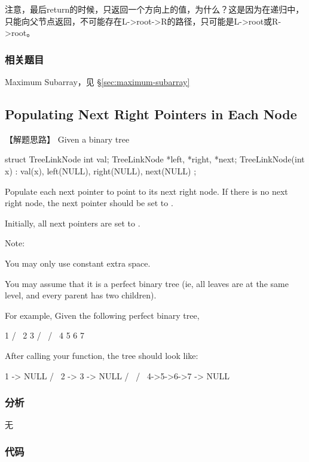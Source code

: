 注意，最后return的时候，只返回一个方向上的值，为什么？这是因为在递归中，只能向父节点返回，不可能存在L->root->R的路径，只可能是L->root或R->root。


\subsubsection{相关题目}
\begindot
\item Maximum Subarray，见 \S \ref{sec:maximum-subarray}
\myenddot


\subsection{Populating Next Right Pointers in Each Node} %
\label{sec:populating-next-right-pointers-in-each-node}


【解题思路】
Given a binary tree
\begin{Code}
	struct TreeLinkNode {
		int val;
		TreeLinkNode *left, *right, *next;
		TreeLinkNode(int x) : val(x), left(NULL), right(NULL), next(NULL) {}
	};
\end{Code}

Populate each next pointer to point to its next right node. If there is no next right node, the next pointer should be set to .

Initially, all next pointers are set to .

Note:
\begindot
\item You may only use constant extra space.
\item You may assume that it is a perfect binary tree (ie, all leaves are at the same level, and every parent has two children).
\myenddot

For example,
Given the following perfect binary tree,
\begin{Code}
	1
	/  \
	2    3
	/ \  / \
	4  5  6  7
\end{Code}

After calling your function, the tree should look like:
\begin{Code}
	1 -> NULL
	/  \
	2 -> 3 -> NULL
	/ \  / \
	4->5->6->7 -> NULL
\end{Code}


\subsubsection{分析}
无

\subsubsection{代码}

